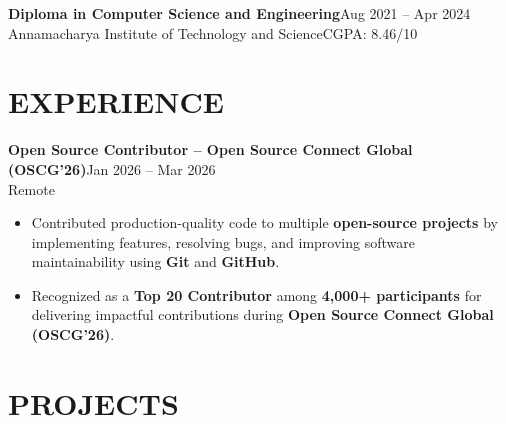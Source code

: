 \documentclass[10pt,a4paper]{article}
\newcommand{\resumeSubheading}[4]{
\textbf{#1}\hfill #2\\
#3\hfill #4
}
\begin{document}
\vspace{5pt}

\resumeSubheading
{Diploma in Computer Science and Engineering}
{Aug 2021 -- Apr 2024}
{Annamacharya Institute of Technology and Science}
{CGPA: 8.46/10}


\section*{EXPERIENCE}

\resumeSubheading
{Open Source Contributor -- Open Source Connect Global (OSCG'26)}
{Jan 2026 -- Mar 2026}
{Remote}
{}


\begin{itemize}[topsep=1pt,itemsep=1pt]

\item Contributed production-quality code to multiple \textbf{open-source projects} by implementing features, resolving bugs, and improving software maintainability using \textbf{Git} and \textbf{GitHub}.

\item Recognized as a \textbf{Top 20 Contributor} among \textbf{4,000+ participants} for delivering impactful contributions during \textbf{Open Source Connect Global (OSCG'26)}.

\end{itemize}


\section*{PROJECTS}

\end{document}
